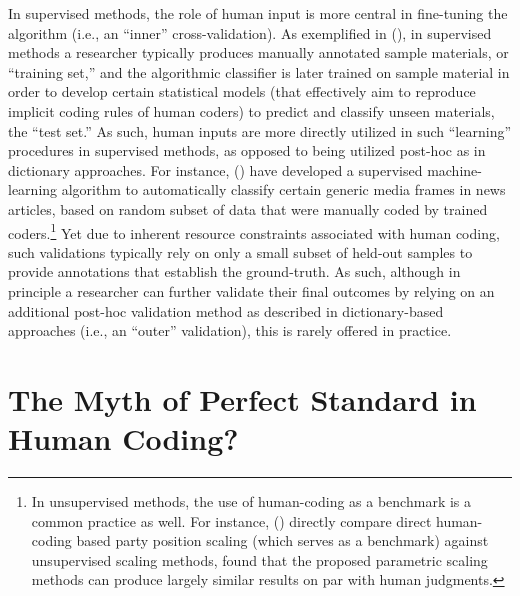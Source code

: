 \documentclass[man, 12pt, a4paper, nolmodern, noextraspace]{apa6}
\begin{document}
    In supervised methods, the role of human input is more central in fine-tuning the algorithm (i.e., an \enquote{inner} cross-validation). As exemplified in \citeauthor{scharkow2013thematic} (\citeyear{scharkow2013thematic}), in supervised methods a researcher typically produces manually annotated sample materials, or \enquote{training set,} and the algorithmic classifier is later trained on sample material in order to develop certain statistical models (that effectively aim to reproduce implicit coding rules of human coders) to predict and classify unseen materials, the \enquote{test set.} As such, human inputs are more directly utilized in such \enquote{learning} procedures in supervised methods, as opposed to being utilized post-hoc as in dictionary approaches. For instance, \citeauthor{burscher2014teaching} (\citeyear{burscher2014teaching}) have developed a supervised machine-learning algorithm to automatically classify certain generic media frames in news articles, based on random subset of data that were manually coded by trained coders.\footnote{In unsupervised methods, the use of human-coding as a benchmark is a common practice as well. For instance, \citeauthor{lowe2013validating} (\citeyear{lowe2013validating}) directly compare direct human-coding based party position scaling (which serves as a benchmark) against unsupervised scaling methods, found that the proposed parametric scaling methods can produce largely similar results on par with human judgments.} Yet due to inherent resource constraints associated with human coding, such validations typically rely on only a small subset of held-out samples to provide annotations that establish the ground-truth. As such, although in principle a researcher can further validate their final outcomes by relying on an additional post-hoc validation method as described in dictionary-based approaches (i.e., an \enquote{outer} validation), this is rarely offered in practice.   
    
\section{The Myth of Perfect Standard in Human Coding?}
\end{document}

